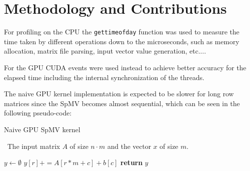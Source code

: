 \documentclass[conference]{IEEEtran}
\begin{document}
    \section{Methodology and Contributions}\label{sec:methodology}

    For profiling on the CPU the \texttt{gettimeofday} function was used to
    measure the time taken by different operations down to the microseconds,
    such as memory allocation, matrix file parsing, input vector value generation,
    etc....

    For the GPU CUDA events were used instead to achieve better accuracy for
    the elapsed time including the internal synchronization of the threads.

    The naive GPU kernel implementation is expected to be slower for long row
    matrices since the SpMV becomes almost sequential, which can be seen in the
    following pseudo-code:
    \begin{algorithm}[h!]
        \caption{Naive GPU SpMV kernel}
        \algorithmicrequire~The input matrix $A$ of size $n \cdot m$ and the vector $x$ of size $m$.
        \begin{algorithmic}[1]
                \State $y \gets \emptyset$
                        \State $y[r] += A[r * m + c] + b[c]$
                    \EndFor
                \EndFor
                \State \textbf{return} $y$
            \EndProcedure
        \end{algorithmic}
        \label{alg:SpMVrow}
    \end{algorithm}
\end{document}
